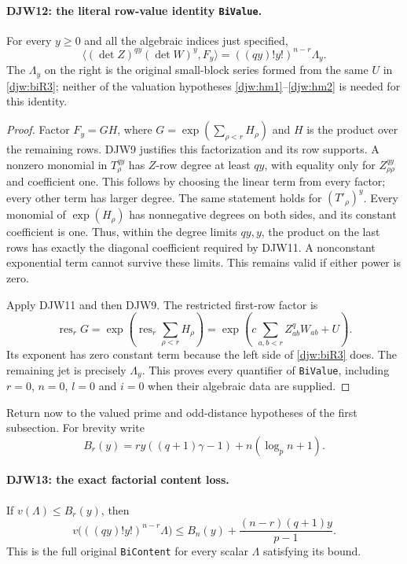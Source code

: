 \paragraph{DJW12: the literal row-value identity \texttt{BiValue}.}
\label{claim:DJW12}
For every $y\ge0$ and all the algebraic indices just specified,
\begin{equation}
 \langle(\det Z)^{qy}(\det W)^y,F_y\rangle
       =((qy)!y!)^{n-r}\Lambda_y.
 \label{djw:bivalue}
\end{equation}
The $\Lambda_y$ on the right is the original small-block series
formed from the same $U$ in \eqref{djw:biR3}; neither of the
valuation hypotheses \eqref{djw:hm1}--\eqref{djw:hm2} is needed
for this identity.

\begin{proof}
Factor $F_y=GH$, where
$G=\exp(\sum_{\rho<r}H_\rho)$ and $H$ is the product over
the remaining rows.  DJW9 justifies this factorization and its
row supports.  A nonzero monomial in $T_\rho^{qy}$ has
$Z$-row degree at least $qy$, with equality only for
$Z_{\rho\rho}^{qy}$ and coefficient one.  This follows by choosing
the linear term from every factor; every other term has larger degree.
The same statement holds for $(T'_\rho)^y$.
Every monomial of $\exp(H_\rho)$ has nonnegative degrees on both
sides, and its constant coefficient is one.  Thus, within the degree
limits $qy,y$, the product on the last rows has exactly the diagonal
coefficient required by DJW11.  A nonconstant exponential term cannot
survive these limits.  This remains valid if either power is zero.

Apply DJW11 and then DJW9.  The restricted first-row factor is
\[
 \operatorname{res}_rG
   =\exp\left(\operatorname{res}_r\sum_{\rho<r}H_\rho\right)
   =\exp\left(c\sum_{a,b<r}Z_{ab}^{q}W_{ab}+U\right).
\]
Its exponent has zero constant term because the left side of
\eqref{djw:biR3} does.  The remaining jet is precisely $\Lambda_y$.
This proves every quantifier of \texttt{BiValue}, including $r=0$,
$n=0$, $l=0$ and $i=0$ when their algebraic data are supplied.
\end{proof}

Return now to the valued prime and odd-distance hypotheses of the
first subsection.  For brevity write
\[
 B_r(y)=ry((q+1)\gamma-1)+n(\log_p n+1).
\]

\paragraph{DJW13: the exact factorial content loss.}
\label{claim:DJW13}
If $v(\Lambda)\le B_r(y)$, then
\begin{equation}
 v\bigl(((qy)!y!)^{n-r}\Lambda\bigr)
       \le B_n(y)+\frac{(n-r)(q+1)y}{p-1}.
 \label{djw:content}
\end{equation}
This is the full original \texttt{BiContent} for every scalar
$\Lambda$ satisfying its bound.


